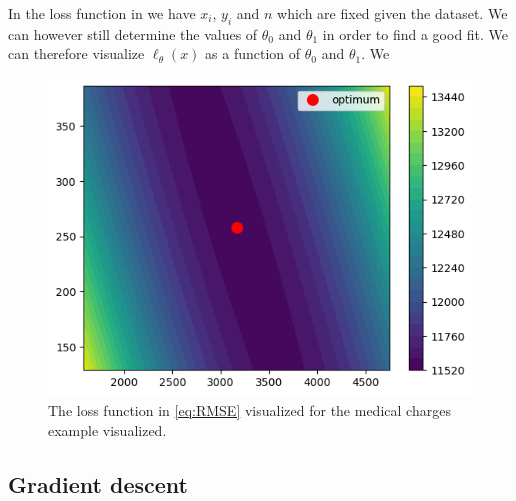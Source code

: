 \documentclass[10pt]{extarticle}
\newcommand{\<}{\langle}
\renewcommand{\>}{\rangle}
\theoremstyle{mystyle}{\newtheorem*{remark}{Remark}}
\theoremstyle{mystyle}{\newtheorem*{remarks}{Remarks}}
\theoremstyle{mystyle}{\newtheorem*{example}{Example}}
\theoremstyle{mystyle}{\newtheorem*{examples}{Examples}}
\theoremstyle{definition}{\newtheorem*{exercise}{Exercise}}
\theoremstyle{warn}
\begin{document}
In the loss function in \label{eq:RMSE_yhat} we have $x_i$, $y_i$ and $n$ which are fixed given the dataset. We can however still determine the values of $\theta_0$ and $\theta_1$ in order to find a good fit. We can therefore visualize $\ell_{\theta}(x)$ as a function of $\theta_0$ and $\theta_1$. We
\begin{figure}
\begin{center}
\includegraphics[scale=0.8]{figures/6.5_error_fun.png}
\caption{The loss function in \eqref{eq:RMSE} visualized for the medical charges example visualized.} \label{6.5_error_fun.png}
\end{center}
\end{figure}

\subsection{Gradient descent} \label{sec:grad_desc}
\end{document}
